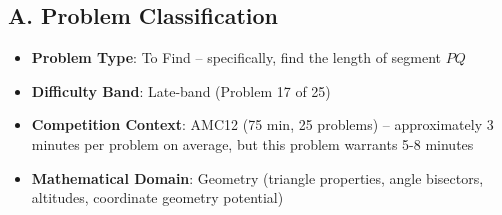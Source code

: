 \documentclass[12pt]{article}
\begin{document}
\begin{problemconfigbox}
\subsection*{A. Problem Classification}
\begin{itemize}[leftmargin=*]
    \item \textbf{Problem Type}: To Find -- specifically, find the length of segment $PQ$
    \item \textbf{Difficulty Band}: Late-band (Problem 17 of 25)
    \item \textbf{Competition Context}: AMC12 (75 min, 25 problems) -- approximately 3 minutes per problem on average, but this problem warrants 5-8 minutes
    \item \textbf{Mathematical Domain}: Geometry (triangle properties, angle bisectors, altitudes, coordinate geometry potential)
\end{itemize}


\end{problemconfigbox}
\end{document}
